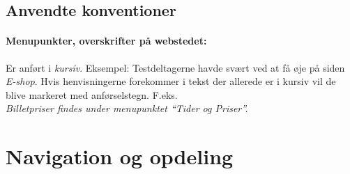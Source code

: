 \documentclass[10pt,a4paper]{article}      %
\begin{document}
\subsection{Anvendte konventioner}

\paragraph{Menupunkter, overskrifter på webstedet:}
Er anført i \emph{kursiv}. Eksempel: Testdeltagerne havde svært ved at få øje på siden \emph{E-shop}.
Hvis henvisningerne forekommer i tekst der allerede er i kursiv vil de blive markeret med anførselstegn. F.eks. \\
\emph{Billetpriser findes under menupunktet ``Tider og Priser''.}
\clearpage



\section{Navigation og opdeling}
\end{document}
